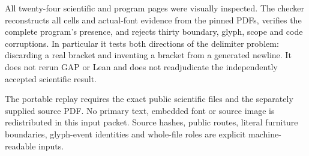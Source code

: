 \documentclass[11pt,a4paper]{article}
\begin{document}
All twenty-four scientific and program pages were visually inspected. The checker reconstructs all cells and actual-font evidence from the pinned PDFs, verifies the complete program's presence, and rejects thirty boundary, glyph, scope and code corruptions. In particular it tests both directions of the delimiter problem: discarding a real bracket and inventing a bracket from a generated newline. It does not rerun GAP or Lean and does not readjudicate the independently accepted scientific result.

The portable replay requires the exact public scientific files and the separately supplied source PDF. No primary text, embedded font or source image is redistributed in this input packet. Source hashes, public routes, literal furniture boundaries, glyph-event identities and whole-file roles are explicit machine-readable inputs.
\end{document}
